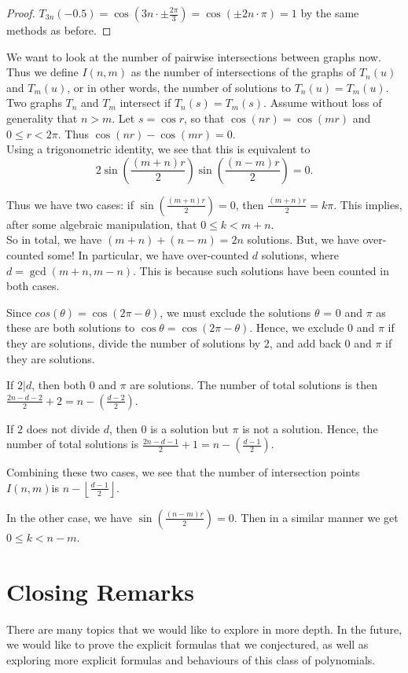 \documentclass[12pt, letterpaper]{article} %
\begin{document}
\begin{proof}
  $T_{3n}(-0.5)=\cos\left(3n\cdot \pm \frac{2\pi}{3}\right)=\cos(\pm 2n\cdot \pi)=1$ by the same methods as before.
\end{proof}

We want to look at the number of pairwise intersections between graphs now. Thus we define $I(n,m)$ as the number of intersections of the graphs of $T_n(u)$ and $T_m(u)$, or in other words, the number of solutions to $T_n(u)=T_m(u)$.\\

Two graphs $T_n$ and $T_m$ intersect if $T_n(s) = T_m(s)$. Assume without loss of generality that $n > m$. Let $s = \cos r$, so that $\cos (nr) = \cos (mr)$ and $0 \le r < 2\pi$. Thus $\cos(nr) - \cos(mr) = 0$.\\

Using a trigonometric identity, we see that this is equivalent to
$$2\sin \left( \dfrac{(m+n)r}{2} \right) \sin \left( \dfrac{(n-m)r}{2} \right) = 0.$$

Thus we have two cases: if $\sin \left( \frac{(m+n)r}{2} \right) = 0$, then $\frac{(m+n)r}{2} = k\pi$. This implies, after some algebraic manipulation, that $0 \le k < m+n$. \\

So in total, we have $(m+n)+(n-m)=2n$ solutions. But, we have over-counted some! In particular, we have over-counted $d$ solutions, where $d = \gcd(m+n, m-n)$. This is because such solutions have been counted in both cases.

Since $cos(\theta) = \cos(2\pi - \theta)$, we must exclude the solutions $\theta$ = $0$ and $\pi$ as these are both solutions to $\cos \theta = \cos (2\pi - \theta)$. Hence, we exclude $0$ and $\pi$ if they are solutions, divide the number of solutions by $2$, and add back $0$ and $\pi$ if they are solutions.

If $2|d$, then both $0$ and $\pi$ are solutions. The number of total solutions is then $\frac{2n-d-2}{2}+2 = n-(\frac{d-2}{2})$.

If $2$ does not divide $d$, then $0$ is a solution but $\pi$ is not a solution. Hence, the number of total solutions is $\frac{2n-d-1}{2}+1 = n - (\frac{d-1}{2})$.

Combining these two cases, we see that the number of intersection points $I(n,m)$is $n - \left\lfloor \frac{d-1}{2} \right\rfloor$.

In the other case, we have $\sin \left( \frac{(n-m)r}{2} \right) = 0$. Then in a similar manner we get $0 \le k < n-m$.

\section{Closing Remarks}
There are many topics that we would like to explore in more depth. In the future, we would like to prove the explicit formulas that we conjectured, as well as exploring more explicit formulas and behaviours of this class of polynomials.
\end{document}
